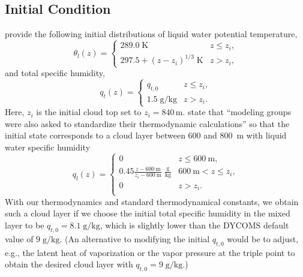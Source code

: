 \documentclass{report}
\begin{document}
\subsection{Initial Condition}

\cite{Stevens05a} provide the following initial distributions of liquid water potential temperature,
\begin{equation}\label{eq:dycoms1}
\theta_l(z) = 
    \begin{cases}
    289.0\;\mathrm{K} & z\leq z_i,\\
    297.5 + (z - z_i)^{1/3}\;\mathrm{K}& z > z_i,
    \end{cases}
\end{equation}
and total specific humidity, 
\begin{equation}\label{eq:dycoms2}
q_t(z) = 
    \begin{cases}
    q_{t,0} & z\leq z_i,\\
    1.5\;\mathrm{g/kg} & z > z_i.
    \end{cases}
\end{equation}
Here, $z_i$ is the initial cloud top set to $z_i=840\,\mathrm{m}$. \cite{Stevens05a} state that ``modeling groups were also asked to standardize their thermodynamic calculations'' so that the initial state corresponds to a cloud layer between 600 and 800~m with liquid water specific humidity
\begin{equation}\label{eq:dycoms3}
q_l(z) = 
    \begin{cases}
    0 & z\leq 600~\mathrm{m},\\
    0.45\frac{{}z - 600~\mathrm{m}}{z_i - 600~\mathrm{m}}\;\mathrm{\frac{g}{kg}}   & 600~\mathrm{m} < z \leq z_i,\\
    0 & z > z_i.\\
    \end{cases}
\end{equation}
With our thermodynamics and standard thermodynamical constants, we obtain such a cloud layer if we choose the initial total specific humidity in the mixed layer to be $q_{t,0} = 8.1\;\mathrm{g/kg}$, which is slightly lower than the DYCOMS default value of $9\;\mathrm{g/kg}$. (An alternative to modifying the initial $q_{t,0}$ would be to adjust, e.g., the latent heat of vaporization or the vapor pressure at the triple point to obtain the desired cloud layer with $q_{t,0} = 9\;\mathrm{g/kg}$.)
\end{document}

